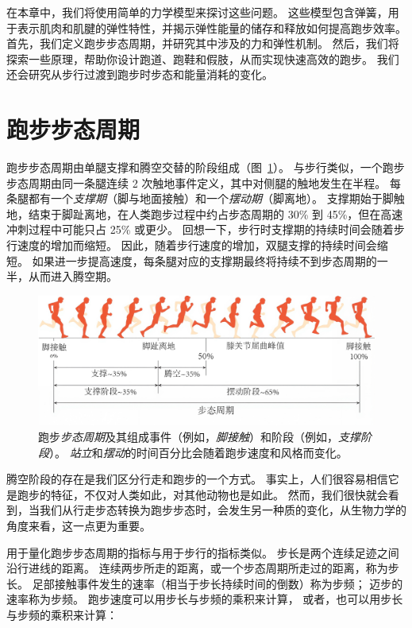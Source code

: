 在本章中，我们将使用简单的力学模型来探讨这些问题。
这些模型包含弹簧，用于表示肌肉和肌腱的弹性特性，并揭示弹性能量的储存和释放如何提高跑步效率。
首先，我们定义跑步步态周期，并研究其中涉及的力和弹性机制。
然后，我们将探索一些原理，帮助你设计跑道、跑鞋和假肢，从而实现快速高效的跑步。
我们还会研究从步行过渡到跑步时步态和能量消耗的变化。


\section{跑步步态周期}

跑步步态周期由单腿支撑和腾空交替的阶段组成（图~\ref{fig:3_1}）。
与步行类似，一个跑步步态周期由同一条腿连续 2 次触地事件定义，其中对侧腿的触地发生在半程。
每条腿都有一个\textit{支撑期}（脚与地面接触）和一个\textit{摆动期}（脚离地）。
支撑期始于脚触地，结束于脚趾离地，在人类跑步过程中约占步态周期的 30\% 到 45\%，但在高速冲刺过程中可能只占 25\% 或更少。
回想一下，步行时支撑期的持续时间会随着步行速度的增加而缩短。
因此，随着步行速度的增加，双腿支撑的持续时间会缩短。
如果进一步提高速度，每条腿对应的支撑期最终将持续不到步态周期的一半，从而进入腾空期。


\begin{figure}[!htb]
	\centering
	\includegraphics[width=1.0\linewidth]{chap3/3_1}
	\caption{跑步\textit{步态周期}及其组成事件（例如，\textit{脚接触}）和阶段（例如，\textit{支撑阶段}）。
		\textit{站立}和\textit{摆动}的时间百分比会随着跑步速度和风格而变化。 \label{fig:3_1}}
\end{figure}

腾空阶段的存在是我们区分行走和跑步的一个方式。
事实上，人们很容易相信它是跑步的特征，不仅对人类如此，对其他动物也是如此。
然而，我们很快就会看到，当我们从行走步态转换为跑步步态时，会发生另一种质的变化，从生物力学的角度来看，这一点更为重要。


用于量化跑步步态周期的指标与用于步行的指标类似。
步长是两个连续足迹之间沿行进线的距离。
连续两步所走的距离，或一个步态周期所走过的距离，称为步长。
足部接触事件发生的速率（相当于步长持续时间的倒数）称为步频；
迈步的速率称为步频。
跑步速度可以用步长与步频的乘积来计算，
或者，也可以用步长与步频的乘积来计算：

